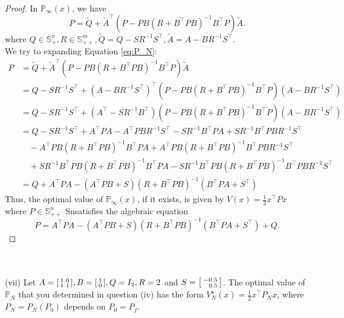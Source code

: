 \documentclass[a4paper,11pt,reqno]{amsart}
\newcommand{\tran}{\intercal}
\begin{document}
\begin{proof}
In $\mathbb{P}_{\infty}(x)$, we have
\begin{equation}
    P=\tilde{Q}+\tilde{A}^{\tran}(P-PB(R+B^{\tran}PB)^{-1}B^{\tran}P)\tilde{A}.
\end{equation}
where $Q\in \mathbb{S}^n_+, R\in \mathbb{S}^m_{++}, \tilde{Q}=Q-SR^{-1}S^{\tran}, \tilde{A}=A-BR^{-1}S^{\tran}$.
\\
We try to expanding Equation \eqref{eq:P_N}:
\begin{align}
    P&=\tilde{Q}+\tilde{A}^{\tran}(P-PB(R+B^{\tran}PB)^{-1}B^{\tran}P)\tilde{A}
    \\
    &=Q-SR^{-1}S^{\tran}+(A-BR^{-1}S^{\tran})^{\tran}(P-PB(R+B^{\tran}PB)^{-1}B^{\tran}P)(A-BR^{-1}S^{\tran})
    \\
    &=Q-SR^{-1}S^{\tran}+(A^{\tran}-SR^{-1}B^{\tran})(P-PB(R+B^{\tran}PB)^{-1}B^{\tran}P)(A-BR^{-1}S^{\tran})
    \\
    &=Q-SR^{-1}S^{\tran}+A^{\tran}PA-A^{\tran}PBR^{-1}S^{\tran}-SR^{-1}B^{\tran}PA+SR^{-1}B^{\tran}PBR^{-1}S^{\tran}
    \\
    &\quad-A^{\tran}PB(R+B^{\tran}PB)^{-1}B^{\tran}PA+A^{\tran}PB(R+B^{\tran}PB)^{-1}B^{\tran}PBR^{-1}S^{\tran}
    \\
    &\quad+SR^{-1}B^{\tran}PB(R+B^{\tran}PB)^{-1}B^{\tran}PA-SR^{-1}B^{\tran}PB(R+B^{\tran}PB)^{-1}B^{\tran}PBR^{-1}S^{\tran}
    \\
    &=Q+A^{\tran}PA-(A^{\tran}PB+S)(R+B^{\tran}PB)^{-1}(B^{\tran}PA+S^{\tran})
\end{align}
Thus, the optimal value of $\mathbb{P}_{\infty}(x)$, if it exists, is given by $V(x)=\frac{1}{2}x^{\tran}Px$ where $P\in \mathbb{S}^n_{++}$ Snsatisfies the algebraic equation
\begin{equation}
    P=A^{\tran}PA-(A^{\tran}PB+S)(R+B^{\tran}PB)^{-1}(B^{\tran}PA+S^{\tran})+Q.
\end{equation}
\end{proof}
\
\\ \\
(vii) Let $A = \begin{bsmallmatrix}1&0\\1&1\end{bsmallmatrix}, B = \begin{bsmallmatrix}1\\0\end{bsmallmatrix}, Q = I_2, R = 2$ and $S=\begin{bsmallmatrix}-0.5\\ \ \ 0.5\end{bsmallmatrix}$. The optimal value of $\mathbb{P}_N$ that you determined in question (iv) has the form $V^{\star}_N(x)=\frac{1}{2}x^{\tran}P_Nx$, where $P_N = P_N(P_0)$ depends on $P_0 = P_f$.
\end{document}
